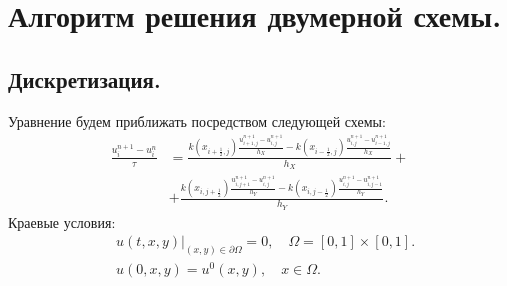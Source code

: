 \documentclass[14pt,a4paper]{extarticle}
\newcommand{\1}{\mathbbm{1}}
\begin{document}
\section{Алгоритм решения двумерной схемы.}
\subsection{Дискретизация.}
Уравнение будем приближать посредством следующей схемы:
\begin{align*}
    \frac{u^{n+1}_i - u^n_i}{\tau} &= \frac{k(x_{i + \frac{1}{2}, j}) \frac{u^{n+1}_{i+1, j} - u^{n+1}_{i, j}}{h_X} - k(x_{i- \frac{1}{2}, j}) \frac{u^{n+1}_{i, j} - u^{n+1}_{i-1, j}}{h_X}}{h_X} + \\
    &+  \frac{k(x_{i, j + \frac{1}{2}}) \frac{u^{n+1}_{i, j+1} - u^{n+1}_{i, j}}{h_Y} - k(x_{i, j- \frac{1}{2}}) \frac{u^{n+1}_{i, j} - u^{n+1}_{i, j-1}}{h_Y}}{h_Y}.
\end{align*}
Краевые условия:
\begin{align*} 
    &u(t, x, y) \big| _{(x, y) \in \partial \Omega} = 0, \quad \Omega = [0,1] \times [0, 1]. \\
    &u(0, x, y) = u^0(x, y), \quad x \in \Omega. 
\end{align*}
\end{document}
